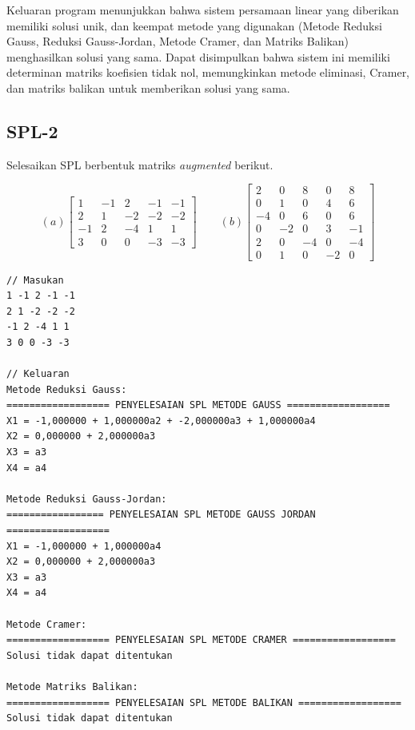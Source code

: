 Keluaran program menunjukkan bahwa sistem persamaan linear yang diberikan memiliki solusi unik, dan keempat metode yang digunakan (Metode Reduksi Gauss, Reduksi Gauss-Jordan, Metode Cramer, dan Matriks Balikan) menghasilkan solusi yang sama. Dapat disimpulkan bahwa sistem ini memiliki determinan matriks koefisien tidak nol, memungkinkan metode eliminasi, Cramer, dan matriks balikan untuk memberikan solusi yang sama.

\pagebreak
\subsection{SPL-2}
Selesaikan SPL berbentuk matriks \textit{augmented} berikut.

\[(a) \begin{bmatrix}
1 & -1 & 2 & -1 & -1\\
2 & 1 & -2 & -2 & -2\\
-1 & 2 & -4 & 1 & 1 \\
3 & 0 & 0 & -3 & -3 
\end{bmatrix} \qquad (b)
\begin{bmatrix}
2   & 0  & 8  & 0  & 8  \\
0   & 1  & 0  & 4  & 6  \\
-4  & 0  & 6  & 0  & 6  \\
0   & -2 & 0  & 3  & -1 \\
2   & 0  & -4 & 0  & -4 \\
0   & 1  & 0  & -2 & 0
\end{bmatrix}\]

\begin{lstlisting}[caption = spl-2a.txt]
// Masukan
1 -1 2 -1 -1
2 1 -2 -2 -2
-1 2 -4 1 1
3 0 0 -3 -3

// Keluaran
Metode Reduksi Gauss:
================== PENYELESAIAN SPL METODE GAUSS ==================
X1 = -1,000000 + 1,000000a2 + -2,000000a3 + 1,000000a4
X2 = 0,000000 + 2,000000a3
X3 = a3
X4 = a4

Metode Reduksi Gauss-Jordan:
================= PENYELESAIAN SPL METODE GAUSS JORDAN ==================
X1 = -1,000000 + 1,000000a4
X2 = 0,000000 + 2,000000a3
X3 = a3
X4 = a4

Metode Cramer:
================== PENYELESAIAN SPL METODE CRAMER ==================
Solusi tidak dapat ditentukan

Metode Matriks Balikan:
================== PENYELESAIAN SPL METODE BALIKAN ==================
Solusi tidak dapat ditentukan\end{lstlisting}

